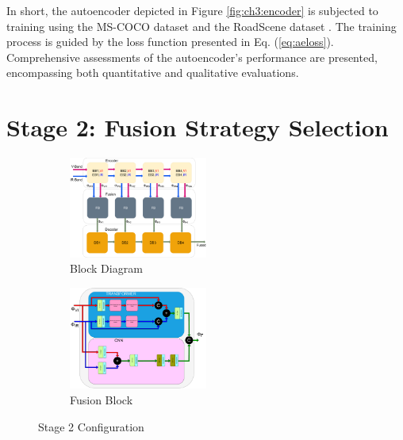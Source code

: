 In short, the autoencoder depicted in Figure \ref{fig:ch3:encoder} is subjected to training using the MS-COCO dataset \cite{lin2014microsoft} and the RoadScene dataset \cite{xu2020aaai}. The training process is guided by the loss function presented in Eq. (\ref{eq:aeloss}). Comprehensive assessments of the autoencoder's performance are presented, encompassing both quantitative and qualitative evaluations. 

\section{Stage 2: Fusion Strategy Selection} \label{subsec:fusion}

\begin{figure}[htbp]
    \centering
    \begin{subfigure}[b]{\textwidth}
        \includegraphics[width=0.5\textwidth]{imgs/stage2.pdf}
        \captionsetup{justification=raggedright,singlelinecheck=false}
        \caption{Block Diagram}
        \label{fig:ch3:stage2}
    \end{subfigure}
    \vspace{0.01cm}
    \begin{subfigure}[b]{\textwidth}
        \includegraphics[width=0.5\textwidth]{imgs/transformerblok.pdf}
        \captionsetup{justification=raggedright,singlelinecheck=false}
        \caption{Fusion Block}
        \label{fig:ch3:fusion}
    \end{subfigure}
    \caption{Stage 2 Configuration}
    \label{fig:ch3:stage2all}
\end{figure}

